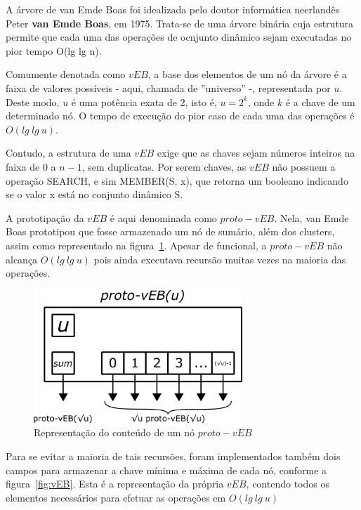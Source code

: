\documentclass[12pt]{article}
\begin{document}
A árvore de van Emde Boas foi idealizada pelo doutor informática neerlandês Peter \textbf{van Emde Boas}, em 1975. Trata-se de uma árvore binária cuja estrutura permite que cada uma das operações de ocnjunto dinâmico sejam executadas no pior tempo O(lg lg n).

Comumente denotada como $vEB$, a base dos elementos de um nó da árvore é a faixa de valores possíveis - aqui, chamada de ''universo'' -, representada por $u$. Deste modo, $u$ é uma potência exata de 2, isto é, $u = 2^{k}$, onde $k$ é a chave de um determinado nó. O tempo de execução do pior caso de cada uma das operações é $O(lg\ lg\ u)$.

Contudo, a estrutura de uma $vEB$ exige que as chaves sejam números inteiros na faixa de $0$ a $n-1$, sem duplicatas. Por serem chaves, as $vEB$ não possuem a operação SEARCH, e sim MEMBER(S, x), que retorna um booleano indicando se o valor x está no conjunto dinâmico S.

A prototipação da $vEB$ é aqui denominada como $proto-vEB$. Nela, van Emde Boas prototipou que fosse armazenado um nó de sumário, além dos clusters, assim como representado na figura~\ref{fig:protovEB}. Apesar de funcional, a $proto-vEB$ não alcança $O(lg\ lg\ u)$ pois ainda executava recursão muitas vezes na maioria das operações.

\begin{figure}[ht]
\centering
\includegraphics[width=0.7\textwidth]{protovEB.png}
\caption{Representação do conteúdo de um nó $proto-vEB$}
\label{fig:protovEB}
\end{figure}

Para se evitar a maioria de tais recursões, foram implementados também dois campos para armazenar a chave mínima e máxima de cada nó, conforme a figura~\ref{fig:vEB}. Esta é a representação da própria $vEB$, contendo todos os elementos necessários para efetuar as operações em $O(lg\ lg\ u)$
\end{document}

